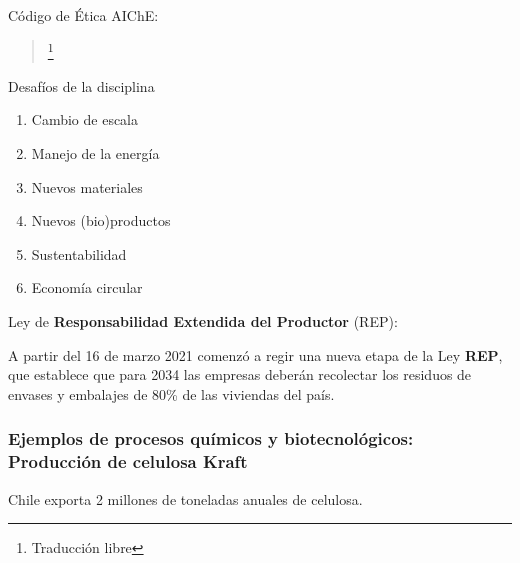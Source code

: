        Código de Ética AIChE:
        
        \begin{quote}
            \textit{}\footnote{Traducción libre}
        \end{quote}
        
        Desafíos de la disciplina
        
        \begin{multicols}{2}
            \begin{enumerate}
                \item Cambio de escala
                \item Manejo de la energía
                \item Nuevos materiales
                \item Nuevos (bio)productos
                \item Sustentabilidad
                \item Economía circular
            \end{enumerate}
        \end{multicols}
        
        Ley de \textbf{Responsabilidad Extendida del Productor} (REP):
        
        \begin{quote}
            \textit{}
        \end{quote}
        
        A partir del 16 de marzo 2021 comenzó a regir una nueva etapa de la Ley \textbf{REP}, que establece que para 2034 las empresas deberán recolectar los residuos de envases y embalajes de 80\% de las viviendas del país.
        
        \subsubsection{Ejemplos de procesos químicos y biotecnológicos: Producción de celulosa Kraft}
        
        Chile exporta 2 millones de toneladas anuales de celulosa.
        
